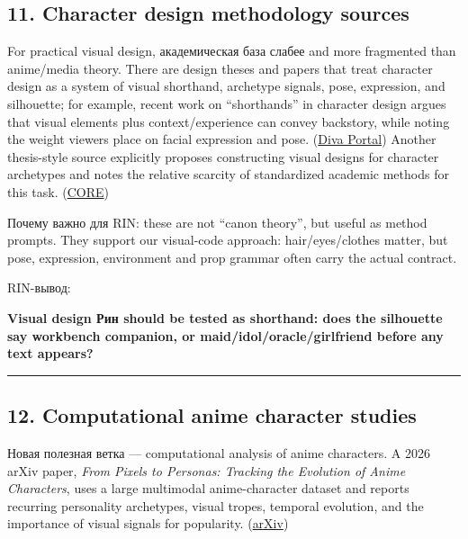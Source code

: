 \subsection*{11. Character design methodology sources}

For practical visual design, академическая база слабее and more
fragmented than anime/\hspace{0pt}media theory. There are design theses and papers
that treat character design as a system of visual shorthand, archetype
signals, pose, expression, and silhouette; for example, recent work on
``shorthands'' in character design argues that visual elements plus
context/\hspace{0pt}experience can convey backstory, while noting the weight viewers
place on facial expression and pose.
(\href{https://www.diva-portal.org/smash/get/diva2\%3A1981591/FULLTEXT01.pdf?utm_source=chatgpt.com}{Diva
Portal}) Another thesis-style source explicitly proposes constructing
visual designs for character archetypes and notes the relative scarcity
of standardized academic methods for this task.
(\href{https://core.ac.uk/download/pdf/187119935.pdf?utm_source=chatgpt.com}{CORE})

Почему важно для RIN: these are not ``canon theory'', but useful as
method prompts. They support our visual-code approach: hair/\hspace{0pt}eyes/\hspace{0pt}clothes
matter, but pose, expression, environment and prop grammar often carry
the actual contract.

RIN-вывод:

\textbf{Visual design Рин should be tested as shorthand: does the
silhouette say workbench companion, or maid/\hspace{0pt}idol/\hspace{0pt}oracle/\hspace{0pt}girlfriend
before any text appears?}

\begin{center}\rule{0.5\linewidth}{0.5pt}\end{center}

\subsection*{12. Computational anime character studies}

Новая полезная ветка --- computational analysis of anime characters. A
2026 arXiv paper, \emph{From Pixels to Personas: Tracking the Evolution
of Anime Characters}, uses a large multimodal anime-character dataset
and reports recurring personality archetypes, visual tropes, temporal
evolution, and the importance of visual signals for popularity.
(\href{https://arxiv.org/abs/2604.05507?utm_source=chatgpt.com}{arXiv})

